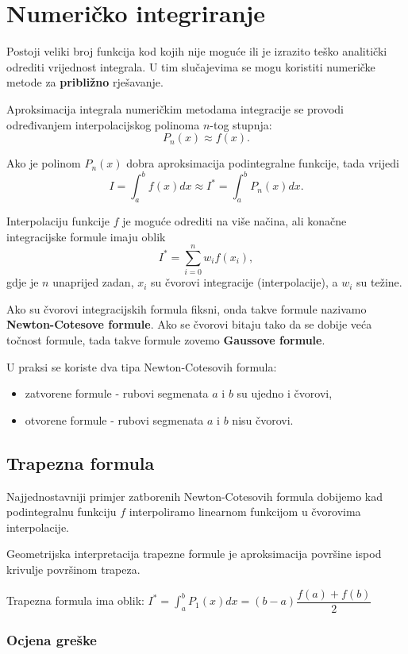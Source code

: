 \section{Numeričko integriranje}

Postoji veliki broj funkcija kod kojih nije moguće ili je izrazito teško
analitički odrediti vrijednost integrala. U tim slučajevima se mogu koristiti
numeričke metode za \textbf{približno} rješavanje.

Aproksimacija integrala numeričkim metodama integracije se provodi određivanjem
interpolacijskog polinoma $n$-tog stupnja:
$$
P_n(x) \approx f(x).
$$

Ako je polinom $P_n(x)$ dobra aproksimacija podintegralne funkcije, tada vrijedi
$$
I = \int_a^b f(x) dx \approx I^* = \int_a^b P_n(x) dx.
$$

Interpolaciju funkcije $f$ je moguće odrediti na više načina, ali konačne
integracijske formule imaju oblik
$$
I^* = \sum_{i=0}^n w_i f(x_i),
$$
gdje je $n$ unaprijed zadan, $x_i$ su čvorovi integracije (interpolacije), a
$w_i$ su težine.

Ako su čvorovi integracijskih formula fiksni, onda takve formule nazivamo
\textbf{Newton-Cotesove formule}. Ako se čvorovi bitaju tako da se dobije veća
točnost formule, tada takve formule zovemo \textbf{Gaussove formule}.

U praksi se koriste dva tipa Newton-Cotesovih formula:
\begin{itemize}
    \item zatvorene formule - rubovi segmenata $a$ i $b$ su ujedno i čvorovi,
    \item otvorene formule - rubovi segmenata $a$ i $b$ nisu čvorovi.
\end{itemize}

\subsection{Trapezna formula}

Najjednostavniji primjer zatborenih Newton-Cotesovih formula dobijemo kad
podintegralnu funkciju $f$ interpoliramo linearnom funkcijom u čvorovima
interpolacije.

Geometrijska interpretacija trapezne formule je aproksimacija površine ispod
krivulje površinom trapeza.

Trapezna formula ima oblik: $\displaystyle
I^* = \int_a^b P_1(x)dx = (b-a)\dfrac{f(a)+f(b)}{2}
$

\subsubsection{Ocjena greške}

